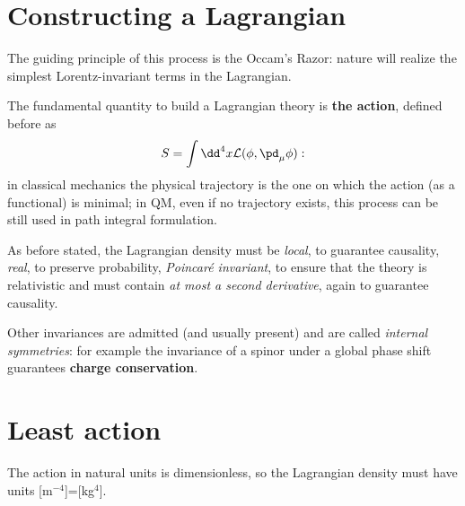 \section{Constructing a Lagrangian}
The guiding principle of this process is the Occam's Razor: nature will realize
the simplest Lorentz-invariant terms in the Lagrangian.

The fundamental quantity to build a Lagrangian theory is \textbf{the action}, defined
before as
$$S = \int\dd^4x\mathcal{L}(\phi,\pd_\mu\phi):$$
in classical mechanics the physical trajectory is the one on which the action (as a 
functional) is minimal; in QM, even if no trajectory exists, this process can be still
used in path integral formulation.

As before stated, the Lagrangian density must be \textit{local}, to guarantee
causality, \textit{real}, to preserve probability, \textit{Poincaré 
invariant}, to ensure that the theory is relativistic and must contain \textit{at
most a second derivative}, again to guarantee causality.

Other invariances are admitted (and usually present) and are called \textit{internal
symmetries}: for example the invariance of a spinor under a global phase shift
guarantees \textbf{charge conservation}.
\section{Least action}
The action in natural units is dimensionless, so the Lagrangian density must have
units [m$^{-4}$]=[kg$^4$].

